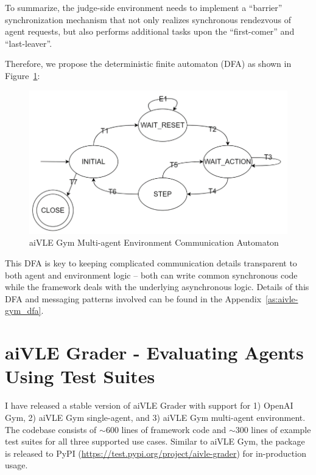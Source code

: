 To summarize, the judge-side environment needs to implement a ``barrier'' synchronization mechanism that not only realizes synchronous rendezvous of agent requests, but also performs additional tasks upon the ``first-comer'' and ``last-leaver''. 

Therefore, we propose the deterministic finite automaton (DFA) as shown in Figure~\ref{fig:aivle-gym-multi-dfa}:
\begin{figure}[H]
    \centering
    \includegraphics{images/aivle-gym-multi-dfa.png}
    \caption{aiVLE Gym Multi-agent Environment Communication Automaton}
    \label{fig:aivle-gym-multi-dfa}
\end{figure}

This DFA is key to keeping complicated communication details transparent to both agent and environment logic – both can write common synchronous code while the framework deals with the underlying asynchronous logic. Details of this DFA and messaging patterns involved can be found in the Appendix~\ref{as:aivle-gym_dfa}.

\section{aiVLE Grader - Evaluating Agents Using Test Suites}
\label{ch:aivle-grader}
I have released a stable version of aiVLE Grader with support for 1) OpenAI Gym, 2) aiVLE Gym single-agent, and 3) aiVLE Gym multi-agent environment. The codebase consists of $\sim$600 lines of framework code and $\sim$300 lines of example test suites for all three supported use cases. Similar to aiVLE Gym, the package is released to PyPI  (\href{https://test.pypi.org/project/aivle-grader/}{https://test.pypi.org/project/aivle-grader}) for in-production usage.

